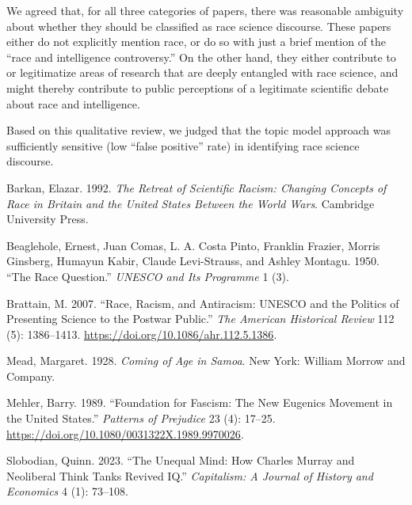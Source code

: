 \documentclass[12pt]{article}
\newlength{\cslhangindent}
\newenvironment{CSLReferences}[2] %
 {%
  \setlength{\parindent}{0pt}
  \ifodd #1 \everypar{\setlength{\hangindent}{\cslhangindent}}\ignorespaces\fi
  \ifnum #2 > 0
  \setlength{\parskip}{#2\baselineskip}
  \fi
 }%
 {}
\begin{document}
We agreed that, for all three categories of papers, there was reasonable
ambiguity about whether they should be classified as race science
discourse. These papers either do not explicitly mention race, or do so
with just a brief mention of the ``race and intelligence controversy.''
On the other hand, they either contribute to or legitimatize areas of
research that are deeply entangled with race science, and might thereby
contribute to public perceptions of a legitimate scientific debate about
race and intelligence.

Based on this qualitative review, we judged that the topic model
approach was sufficiently sensitive (low ``false positive'' rate) in
identifying race science discourse.

\hypertarget{refs}{}
\begin{CSLReferences}{1}{0}
\leavevmode{}%
Barkan, Elazar. 1992. \emph{The {Retreat} of {Scientific Racism}:
{Changing Concepts} of {Race} in {Britain} and the {United States
Between} the {World Wars}}. {Cambridge University Press}.

\leavevmode{}%
Beaglehole, Ernest, Juan Comas, L. A. Costa Pinto, Franklin Frazier,
Morris Ginsberg, Humayun Kabir, Claude Levi-Strauss, and Ashley Montagu.
1950. {``The {Race Question}.''} \emph{UNESCO and Its Programme} 1 (3).

\leavevmode{}%
Brattain, M. 2007. {``Race, {Racism}, and {Antiracism}: {UNESCO} and the
{Politics} of {Presenting Science} to the {Postwar Public}.''} \emph{The
American Historical Review} 112 (5): 1386--1413.
\url{https://doi.org/10.1086/ahr.112.5.1386}.

\leavevmode{}%
Mead, Margaret. 1928. \emph{Coming of {Age} in {Samoa}}. {New York}:
{William Morrow and Company}.

\leavevmode{}%
Mehler, Barry. 1989. {``Foundation for Fascism: {The} New Eugenics
Movement in the {United States}.''} \emph{Patterns of Prejudice} 23 (4):
17--25. \url{https://doi.org/10.1080/0031322X.1989.9970026}.

\leavevmode{}%
Slobodian, Quinn. 2023. {``The {Unequal Mind}: {How Charles Murray} and
{Neoliberal Think Tanks Revived IQ}.''} \emph{Capitalism: A Journal of
History and Economics} 4 (1): 73--108.

\end{CSLReferences}
\end{document}
